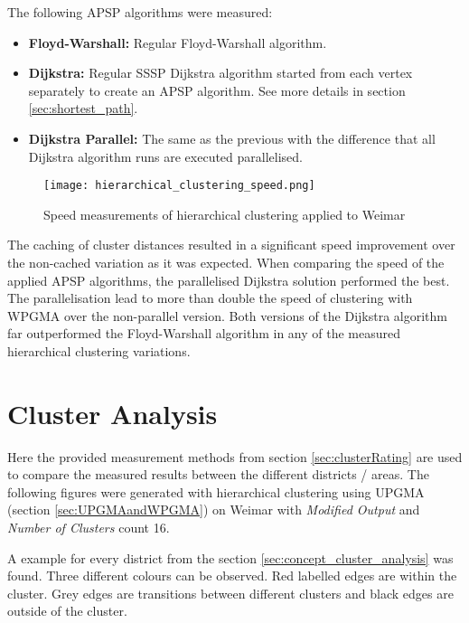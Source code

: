 The following \acrshort{APSP} algorithms were measured:

\begin{itemize}
    \item \textbf{Floyd-Warshall:} Regular Floyd-Warshall algorithm.
    \item \textbf{Dijkstra:} Regular \acrshort{SSSP} Dijkstra algorithm started from each vertex separately to create an \acrshort{APSP} algorithm. See more details in section \ref{sec:shortest_path}.
    \item \textbf{Dijkstra Parallel:} The same as the previous with the difference that all Dijkstra algorithm runs are executed parallelised.
\end{itemize}

\begin{figure}[!ht]
    \centering
    \begin{mdframed}[style=mdthight]
        \texttt{[image: hierarchical\_clustering\_speed.png]}
    \end{mdframed}
    \caption{Speed measurements of hierarchical clustering applied to Weimar \label{fig:hierarchical_clustering_speed}}
\end{figure}

The caching of cluster distances resulted in a significant speed improvement over the non-cached variation as it was expected. When comparing the speed of the applied \acrshort{APSP} algorithms, the parallelised Dijkstra solution performed the best. The parallelisation lead to more than double the speed of clustering with WPGMA over the non-parallel version. Both versions of the Dijkstra algorithm far outperformed the Floyd-Warshall algorithm in any of the measured hierarchical clustering variations.

\pagebreak
\section{Cluster Analysis}
\label{sec:measurements-cluster-analysis}
Here the provided measurement methods from section \ref{sec:clusterRating} are used to compare the measured results between the different districts / areas. The following figures were generated with hierarchical clustering using UPGMA (section \ref{sec:UPGMAandWPGMA}) on Weimar with \textit{Modified Output} and \textit{Number of Clusters} count 16.

A example for every district from the section \ref{sec:concept_cluster_analysis} was found. Three different colours can be observed. Red labelled edges are within the cluster. Grey edges are transitions between different clusters and black edges are outside of the cluster.

